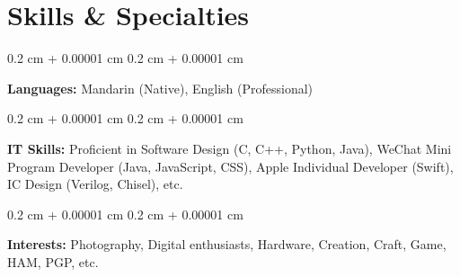 \documentclass[10pt, letterpaper]{article}
\newenvironment{onecolentry}{
    \begin{adjustwidth}{
        0.2 cm + 0.00001 cm
    }{
        0.2 cm + 0.00001 cm
    }
}{
    \end{adjustwidth}
} %
\begin{document}
        
    \section{Skills \& Specialties}



        
        \begin{onecolentry}
            \textbf{Languages:} Mandarin (Native), English (Professional)
        \end{onecolentry}

        \vspace{0.2 cm}

        \begin{onecolentry}
            \textbf{IT Skills:} Proficient in Software Design (C, C++, Python, Java), WeChat Mini Program Developer (Java, JavaScript, CSS), Apple Individual Developer (Swift), IC Design (Verilog, Chisel), etc.
        \end{onecolentry}
            
        \vspace{0.2 cm}

        \begin{onecolentry}
            \textbf{Interests: }Photography, Digital enthusiasts, Hardware, Creation, Craft, Game, HAM, PGP, etc.
        \end{onecolentry}


    
\end{document}
